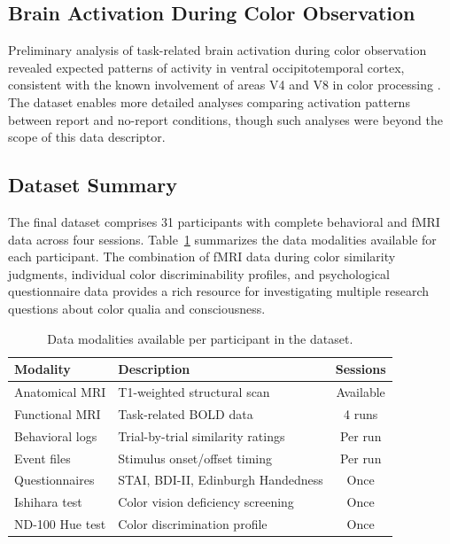 \documentclass[11pt]{article}
\begin{document}
\subsection{Brain Activation During Color Observation}

Preliminary analysis of task-related brain activation during color observation revealed expected patterns of activity in ventral occipitotemporal cortex, consistent with the known involvement of areas V4 and V8 in color processing \citep{bartels2000architecture}. The dataset enables more detailed analyses comparing activation patterns between report and no-report conditions, though such analyses were beyond the scope of this data descriptor.

\subsection{Dataset Summary}

The final dataset comprises 31 participants with complete behavioral and fMRI data across four sessions. Table~\ref{tab:modalities} summarizes the data modalities available for each participant. The combination of fMRI data during color similarity judgments, individual color discriminability profiles, and psychological questionnaire data provides a rich resource for investigating multiple research questions about color qualia and consciousness.

\begin{table}[htbp]
\centering
\caption{Data modalities available per participant in the dataset.}
\label{tab:modalities}
\begin{tabular}{llc}
\toprule
Modality & Description & Sessions \\
\midrule
Anatomical MRI & T1-weighted structural scan & Available \\
Functional MRI & Task-related BOLD data & 4 runs \\
Behavioral logs & Trial-by-trial similarity ratings & Per run \\
Event files & Stimulus onset/offset timing & Per run \\
Questionnaires & STAI, BDI-II, Edinburgh Handedness & Once \\
Ishihara test & Color vision deficiency screening & Once \\
ND-100 Hue test & Color discrimination profile & Once \\
\bottomrule
\end{tabular}
\end{table}
\end{document}
